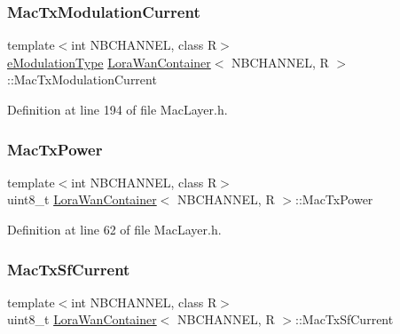 \subsubsection{\texorpdfstring{Mac\+Tx\+Modulation\+Current}{MacTxModulationCurrent}}
{\footnotesize\ttfamily template$<$int N\+B\+C\+H\+A\+N\+N\+EL, class R$>$ \\
\mbox{\hyperlink{_define_8h_a81bbaee3ae5a0ec0040b6faedbf80b2f}{e\+Modulation\+Type}} \mbox{\hyperlink{class_lora_wan_container}{Lora\+Wan\+Container}}$<$ N\+B\+C\+H\+A\+N\+N\+EL, R $>$\+::Mac\+Tx\+Modulation\+Current\hspace{0.3cm}{\ttfamily [protected]}}



Definition at line 194 of file Mac\+Layer.\+h.

\mbox{\label{class_lora_wan_container_ae294fd8611d2487aeb9a8b1185daf8ea}} 
\subsubsection{\texorpdfstring{Mac\+Tx\+Power}{MacTxPower}}
{\footnotesize\ttfamily template$<$int N\+B\+C\+H\+A\+N\+N\+EL, class R$>$ \\
uint8\+\_\+t \mbox{\hyperlink{class_lora_wan_container}{Lora\+Wan\+Container}}$<$ N\+B\+C\+H\+A\+N\+N\+EL, R $>$\+::Mac\+Tx\+Power}



Definition at line 62 of file Mac\+Layer.\+h.

\mbox{\label{class_lora_wan_container_a22b5a7290fac2cc6886d22ef153770f4}} 
\subsubsection{\texorpdfstring{Mac\+Tx\+Sf\+Current}{MacTxSfCurrent}}
{\footnotesize\ttfamily template$<$int N\+B\+C\+H\+A\+N\+N\+EL, class R$>$ \\
uint8\+\_\+t \mbox{\hyperlink{class_lora_wan_container}{Lora\+Wan\+Container}}$<$ N\+B\+C\+H\+A\+N\+N\+EL, R $>$\+::Mac\+Tx\+Sf\+Current\hspace{0.3cm}{\ttfamily [protected]}}




